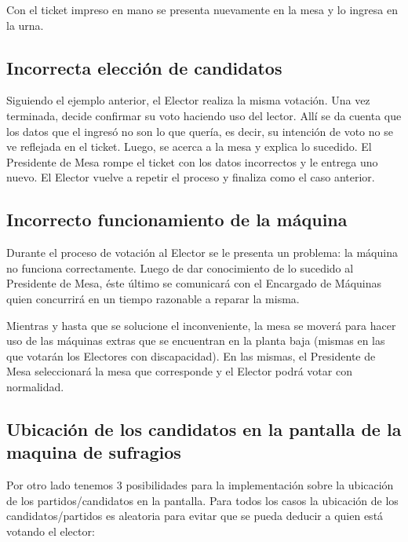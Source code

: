 \documentclass[spanish, 10pt,a4paper]{article}
\numberwithin{equation}{section} %
\begin{document}
	Con el ticket impreso en mano se presenta nuevamente en la mesa y lo ingresa en la urna.	
	
\subsection{Incorrecta elección de candidatos}
	Siguiendo el ejemplo anterior, el Elector realiza la misma votación. Una vez terminada, decide confirmar su voto haciendo uso del lector. Allí se da cuenta que los datos que el ingresó no son lo que quería, es decir, su intención de voto no se ve reflejada en el ticket. Luego, se acerca a la mesa y explica lo sucedido. El Presidente de Mesa rompe el ticket con los datos incorrectos y le entrega uno nuevo. El Elector vuelve a repetir el proceso y finaliza como el caso anterior. 

\subsection{Incorrecto funcionamiento de la máquina}
	Durante el proceso de votación al Elector se le presenta un problema: la máquina no funciona correctamente. Luego de dar conocimiento de lo sucedido al Presidente de Mesa, éste último se comunicará con el Encargado de Máquinas quien concurrirá en un tiempo razonable a reparar la misma. 

	Mientras y hasta que se solucione el inconveniente, la mesa se moverá para hacer uso de las máquinas extras que se encuentran en la planta baja  (mismas en las que votarán los Electores con discapacidad). En las mismas,  el Presidente de Mesa seleccionará la mesa que corresponde y el Elector podrá votar con normalidad.

\subsection{Ubicación de los candidatos en la pantalla de la maquina de sufragios}
Por otro lado tenemos 3 posibilidades para la implementación sobre la ubicación de los partidos/candidatos en la pantalla. Para todos los casos la ubicación de los candidatos/partidos es aleatoria para evitar que se pueda deducir a quien está votando el elector:
\end{document}
